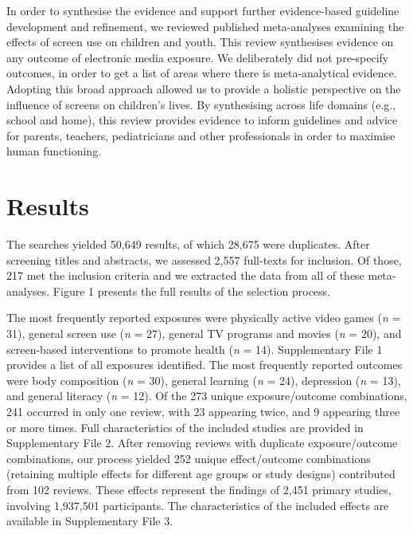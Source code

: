 \documentclass[
  english,
  man]{apa6}
\begin{document}
In order to synthesise the evidence and support further evidence-based guideline development and refinement, we reviewed published meta-analyses examining the effects of screen use on children and youth.
This review synthesises evidence on any outcome of electronic media exposure.
We deliberately did not pre-specify outcomes, in order to get a list of areas where there is meta-analytical evidence.
Adopting this broad approach allowed us to provide a holistic perspective on the influence of screens on children's lives.
By synthesising across life domains (e.g., school and home), this review provides evidence to inform guidelines and advice for parents, teachers, pediatricians and other professionals in order to maximise human functioning.

\newpage

\hypertarget{results}{%
\section{Results}\label{results}}

The searches yielded 50,649 results, of which 28,675 were duplicates.
After screening titles and abstracts, we assessed 2,557 full-texts for inclusion.
Of those, 217 met the inclusion criteria and we extracted the data from all of these meta-analyses.
Figure 1 presents the full results of the selection process.

The most frequently reported exposures were physically active video games (\emph{n} = 31), general screen use (\emph{n} = 27), general TV programs and movies (\emph{n} = 20), and screen-based interventions to promote health (\emph{n} = 14).
Supplementary File 1 provides a list of all exposures identified.
The most frequently reported outcomes were body composition (\emph{n} = 30), general learning (\emph{n} = 24), depression (\emph{n} = 13), and general literacy (\emph{n} = 12).
Of the 273 unique exposure/outcome combinations, 241 occurred in only one review, with 23 appearing twice, and 9 appearing three or more times.
Full characteristics of the included studies are provided in Supplementary File 2.
After removing reviews with duplicate exposure/outcome combinations, our process yielded 252 unique effect/outcome combinations (retaining multiple effects for different age groups or study designs) contributed from 102 reviews.
These effects represent the findings of 2,451 primary studies, involving 1,937,501 participants.
The characteristics of the included effects are available in Supplementary File 3.
\end{document}
